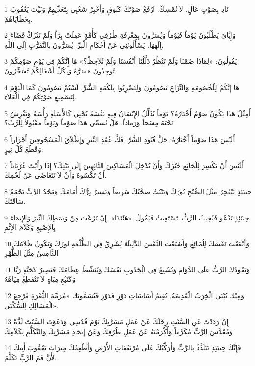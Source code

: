 \par 1 نَادِ بِصَوْتٍ عَالٍ. لاَ تُمْسِكْ. ارْفَعْ صَوْتَكَ كَبُوقٍ وَأَخْبِرْ شَعْبِي بِتَعَدِّيهِمْ وَبَيْتَ يَعْقُوبَ بِخَطَايَاهُمْ.
\par 2 وَإِيَّايَ يَطْلُبُونَ يَوْماً فَيَوْماً وَيُسَرُّونَ بِمَعْرِفَةِ طُرُقِي كَأُمَّةٍ عَمِلَتْ بِرّاً وَلَمْ تَتْرُكْ قَضَاءَ إِلَهِهَا. يَسْأَلُونَنِي عَنْ أَحْكَامِ الْبِرِّ. يُسَرُّونَ بِالتَّقَرُّبِ إِلَى اللَّهِ.
\par 3 يَقُولُونَ: «لِمَاذَا صُمْنَا وَلَمْ تَنْظُرْ ذَلَّلْنَا أَنْفُسَنَا وَلَمْ تُلاَحِظْ؟» هَا إِنَّكُمْ فِي يَوْمِ صَوْمِكُمْ تُوجِدُونَ مَسَرَّةً وَبِكُلِّ أَشْغَالِكُمْ تُسَخِّرُونَ.
\par 4 هَا إِنَّكُمْ لِلْخُصُومَةِ وَالنِّزَاعِ تَصُومُونَ وَلِتَضْرِبُوا بِلَكْمَةِ الشَّرِّ. لَسْتُمْ تَصُومُونَ كَمَا الْيَوْمَ لِتَسْمِيعِ صَوْتِكُمْ فِي الْعَلاَءِ.
\par 5 أَمِثْلُ هَذَا يَكُونُ صَوْمٌ أَخْتَارُهُ؟ يَوْماً يُذَلِّلُ الإِنْسَانُ فِيهِ نَفْسَهُ يُحْنِي كَالأَسَلَةِ رَأْسَهُ وَيَفْرِشُ تَحْتَهُ مِسْحاً وَرَمَاداً. هَلْ تُسَمِّي هَذَا صَوْماً وَيَوْماً مَقْبُولاً لِلرَّبِّ؟
\par 6 أَلَيْسَ هَذَا صَوْماً أَخْتَارُهُ: حَلَّ قُيُودِ الشَّرِّ. فَكَّ عُقَدِ النِّيرِ وَإِطْلاَقَ الْمَسْحُوقِينَ أَحْرَاراً وَقَطْعَ كُلِّ نِيرٍ.
\par 7 أَلَيْسَ أَنْ تَكْسِرَ لِلْجَائِعِ خُبْزَكَ وَأَنْ تُدْخِلَ الْمَسَاكِينَ التَّائِهِينَ إِلَى بَيْتِكَ؟ إِذَا رَأَيْتَ عُرْيَاناً أَنْ تَكْسُوهُ وَأَنْ لاَ تَتَغَاضَى عَنْ لَحْمِكَ.
\par 8 حِينَئِذٍ يَنْفَجِرُ مِثْلَ الصُّبْحِ نُورُكَ وَتَنْبُتُ صِحَّتُكَ سَرِيعاً وَيَسِيرُ بِرُّكَ أَمَامَكَ وَمَجْدُ الرَّبِّ يَجْمَعُ سَاقَتَكَ.
\par 9 حِينَئِذٍ تَدْعُو فَيُجِيبُ الرَّبُّ. تَسْتَغِيثُ فَيَقُولُ: «هَئَنَذَا». إِنْ نَزَعْتَ مِنْ وَسَطِكَ النِّيرَ وَالإِيمَاءَ بِالإِصْبِعِ وَكَلاَمَ الإِثْمِ
\par 10 وَأَنْفَقْتَ نَفْسَكَ لِلْجَائِعِ وَأَشْبَعْتَ النَّفْسَ الذَّلِيلَةَ يُشْرِقُ فِي الظُّلْمَةِ نُورُكَ وَيَكُونُ ظَلاَمُكَ الدَّامِسُ مِثْلَ الظُّهْرِ
\par 11 وَيَقُودُكَ الرَّبُّ عَلَى الدَّوَامِ وَيُشْبِعُ فِي الْجَدُوبِ نَفْسَكَ وَيُنَشِّطُ عِظَامَكَ فَتَصِيرُ كَجَنَّةٍ رَيَّا وَكَنَبْعِ مِيَاهٍ لاَ تَنْقَطِعُ مِيَاهُهُ.
\par 12 وَمِنْكَ تُبْنَى الْخِرَبُ الْقَدِيمَةُ. تُقِيمُ أَسَاسَاتِ دَوْرٍ فَدَوْرٍ فَيُسَمُّونَكَ «مُرَمِّمَ الثُّغْرَةِ مُرْجِعَ الْمَسَالِكِ لِلسُّكْنَى».
\par 13 إِنْ رَدَدْتَ عَنِ السَّبْتِ رِجْلَكَ عَنْ عَمَلِ مَسَرَّتِكَ يَوْمَ قُدْسِي وَدَعَوْتَ السَّبْتَ لَذَّةً وَمُقَدَّسَ الرَّبِّ مُكَرَّماً وَأَكْرَمْتَهُ عَنْ عَمَلِ طُرُقِكَ وَعَنْ إِيجَادِ مَسَرَّتِكَ وَالتَّكَلُّمِ بِكَلاَمِكَ
\par 14 فَإِنَّكَ حِينَئِذٍ تَتَلَذَّذُ بِالرَّبِّ وَأُرَكِّبُكَ عَلَى مُرْتَفَعَاتِ الأَرْضِ وَأُطْعِمُكَ مِيرَاثَ يَعْقُوبَ أَبِيكَ لأَنَّ فَمَ الرَّبِّ تَكَلَّمَ.

